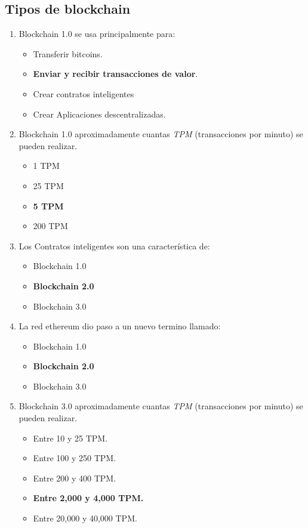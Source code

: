 \documentclass[a4paper,12pt]{lib/pub}
\begin{document}
\subsection{Tipos de blockchain}
\begin{enumerate}
	\item Blockchain 1.0 se usa principalmente para:
	\begin{itemize}
		\item Transferir bitcoins.
		\item \textbf{Enviar y recibir transacciones de valor}.
		\item Crear contratos inteligentes
		\item Crear Aplicaciones descentralizadas.
	\end{itemize}
	\item Blockchain 1.0 aproximadamente cuantas \textit{TPM} (transacciones por minuto) se pueden realizar.
	\begin{itemize}
		\item 1 TPM
		\item 25 TPM
		\item \textbf{5 TPM}
		\item 200 TPM
	\end{itemize}
	\item Los Contratos inteligentes son una característica de:
	\begin{itemize}
		\item Blockchain 1.0
		\item \textbf{Blockchain 2.0}
		\item Blockchain 3.0
	\end{itemize}
	\item La red ethereum dio paso a un nuevo termino llamado:
	\begin{itemize}
		\item Blockchain 1.0
		\item \textbf{Blockchain 2.0}
		\item Blockchain 3.0
	\end{itemize}
	\item Blockchain 3.0 aproximadamente cuantas \textit{TPM} (transacciones por minuto) se pueden realizar.
	\begin{itemize}
		\item Entre 10 y 25 TPM.
		\item Entre 100 y 250 TPM.
		\item Entre 200 y 400 TPM.
		\item \textbf{Entre 2,000 y 4,000 TPM.}
		\item Entre 20,000 y 40,000 TPM.
	\end{itemize}
\end{enumerate}
\end{document}
